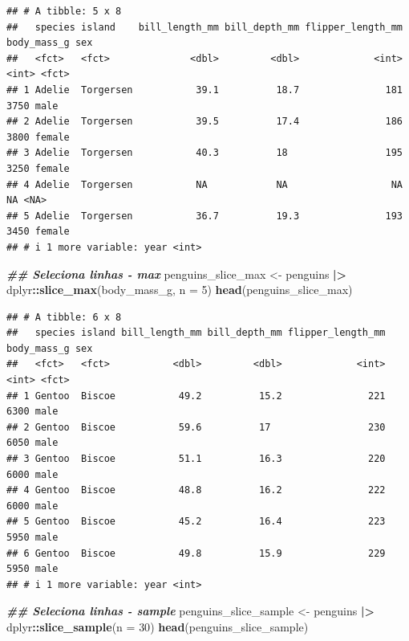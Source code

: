 \documentclass[
]{article}
\newenvironment{Shaded}{\begin{snugshade}}{\end{snugshade}}
\newcommand{\AttributeTok}[1]{\textcolor[rgb]{0.13,0.29,0.53}{#1}}
\newcommand{\DecValTok}[1]{\textcolor[rgb]{0.00,0.00,0.81}{#1}}
\newcommand{\DocumentationTok}[1]{\textcolor[rgb]{0.56,0.35,0.01}{\textbf{\textit{#1}}}}
\newcommand{\FunctionTok}[1]{\textcolor[rgb]{0.13,0.29,0.53}{\textbf{#1}}}
\newcommand{\NormalTok}[1]{#1}
\newcommand{\OtherTok}[1]{\textcolor[rgb]{0.56,0.35,0.01}{#1}}
\newcommand{\SpecialCharTok}[1]{\textcolor[rgb]{0.81,0.36,0.00}{\textbf{#1}}}
\begin{document}
\begin{verbatim}
## # A tibble: 5 x 8
##   species island    bill_length_mm bill_depth_mm flipper_length_mm body_mass_g sex   
##   <fct>   <fct>              <dbl>         <dbl>             <int>       <int> <fct> 
## 1 Adelie  Torgersen           39.1          18.7               181        3750 male  
## 2 Adelie  Torgersen           39.5          17.4               186        3800 female
## 3 Adelie  Torgersen           40.3          18                 195        3250 female
## 4 Adelie  Torgersen           NA            NA                  NA          NA <NA>  
## 5 Adelie  Torgersen           36.7          19.3               193        3450 female
## # i 1 more variable: year <int>
\end{verbatim}

\begin{Shaded}
\begin{Highlighting}[]
\DocumentationTok{\#\# Seleciona linhas {-} max}
\NormalTok{penguins\_slice\_max }\OtherTok{\textless{}{-}}\NormalTok{ penguins }\SpecialCharTok{|\textgreater{}} 
\NormalTok{    dplyr}\SpecialCharTok{::}\FunctionTok{slice\_max}\NormalTok{(body\_mass\_g, }\AttributeTok{n =} \DecValTok{5}\NormalTok{)}
\FunctionTok{head}\NormalTok{(penguins\_slice\_max)}
\end{Highlighting}
\end{Shaded}

\begin{verbatim}
## # A tibble: 6 x 8
##   species island bill_length_mm bill_depth_mm flipper_length_mm body_mass_g sex  
##   <fct>   <fct>           <dbl>         <dbl>             <int>       <int> <fct>
## 1 Gentoo  Biscoe           49.2          15.2               221        6300 male 
## 2 Gentoo  Biscoe           59.6          17                 230        6050 male 
## 3 Gentoo  Biscoe           51.1          16.3               220        6000 male 
## 4 Gentoo  Biscoe           48.8          16.2               222        6000 male 
## 5 Gentoo  Biscoe           45.2          16.4               223        5950 male 
## 6 Gentoo  Biscoe           49.8          15.9               229        5950 male 
## # i 1 more variable: year <int>
\end{verbatim}

\begin{Shaded}
\begin{Highlighting}[]
\DocumentationTok{\#\# Seleciona linhas {-} sample}
\NormalTok{penguins\_slice\_sample }\OtherTok{\textless{}{-}}\NormalTok{ penguins }\SpecialCharTok{|\textgreater{}} 
\NormalTok{    dplyr}\SpecialCharTok{::}\FunctionTok{slice\_sample}\NormalTok{(}\AttributeTok{n =} \DecValTok{30}\NormalTok{)}
\FunctionTok{head}\NormalTok{(penguins\_slice\_sample)}
\end{Highlighting}
\end{Shaded}
\end{document}
